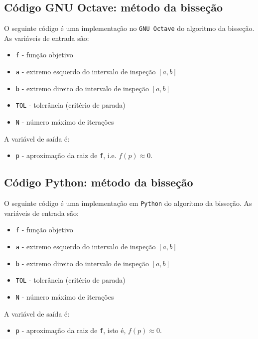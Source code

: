 
\fi
\ifisoctave
\subsection{Código GNU Octave: método da bisseção}\label{subsec:codigo_bissecao}

O seguinte código é uma implementação no \verb+GNU Octave+ do algoritmo da bisseção. As variáveis de entrada são:
\begin{itemize}
\item \verb+f+ - função objetivo
\item \verb+a+ - extremo esquerdo do intervalo de inspeção $[a, b]$
\item \verb+b+ - extremo direito do intervalo de inspeção $[a, b]$
\item \verb+TOL+ - tolerância (critério de parada)
\item \verb+N+ - número máximo de iterações
\end{itemize}
A variável de saída é:
\begin{itemize}
\item \verb+p+ - aproximação da raiz de \verb+f+, i.e. $f(p) \approx 0$.
\end{itemize}


\fi
\ifispython
\subsection{Código Python: método da bisseção}\label{subsec:codigo_bissecao}

O seguinte código é uma implementação em \verb+Python+ do algoritmo da bisseção. As variáveis de entrada são:
\begin{itemize}
\item \verb+f+ - função objetivo
\item \verb+a+ - extremo esquerdo do intervalo de inspeção $[a, b]$
\item \verb+b+ - extremo direito do intervalo de inspeção $[a, b]$
\item \verb+TOL+ - tolerância (critério de parada)
\item \verb+N+ - número máximo de iterações
\end{itemize}
A variável de saída é:
\begin{itemize}
\item \verb+p+ - aproximação da raiz de \verb+f+, isto é, $f(p) \approx 0$.
\end{itemize}

